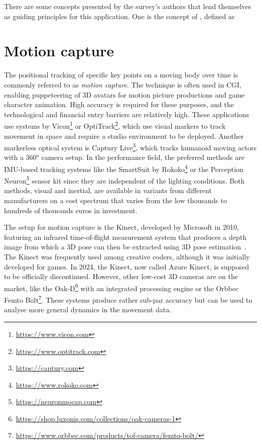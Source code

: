There are some concepts presented by the survey's authors that lend themselves as guiding principles for this application.
One is the concept of , defined as

\section{Motion capture}
\label{sec:motion-capture}

The positional tracking of specific key points on a moving body over time is commonly referred to as \emph{motion capture}.
The technique is often used in \ac{CGI}, enabling puppeteering of \ac{3D} avatars for motion picture productions and game character animation.
High accuracy is required for these purposes, and the technological and financial entry barriers are relatively high.
These applications use systems by Vicon\footnote{\url{https://www.vicon.com}} or OptiTrack\footnote{\url{https://www.optitrack.com}}, which use visual markers to track movement in space and require a studio environment to be deployed.
Another markerless optical system is Captury Live\footnote{\url{https://captury.com}}, which tracks humanoid moving actors with a 360° camera setup.
In the performance field, the preferred methods are IMU-based tracking systems like the SmartSuit by Rokoko\footnote{\url{https://www.rokoko.com}} or the Perception Neuron\footnote{\url{https://neuronmocap.com}} sensor kit since they are independent of the lighting conditions.
Both methods, visual and inertial, are available in variants from different manufacturers on a cost spectrum that varies from the low thousands to hundreds of thousands euros in investment.

The  setup for motion capture is the Kinect, developed by Microsoft in 2010, featuring an infrared time-of-flight measurement system that produces a depth image from which a 3D pose can then be extracted using \ac{3D} pose estimation~\parencite[see][]{poseEstimationPaper}.
The Kinect was frequently used among creative coders, although it was initially developed for games.
In 2024, the Kinect, now called Azure Kinect, is supposed to be officially discontinued.
However, other low-cost 3D cameras are on the market, like the Oak-D\footnote{\url{https://shop.luxonis.com/collections/oak-cameras-1}} with an integrated processing engine or the Orbbec Femto Bolt\footnote{\url{https://www.orbbec.com/products/tof-camera/femto-bolt/}}.
These systems produce rather sub-par accuracy but can be used to analyse more general dynamics in the movement data.

